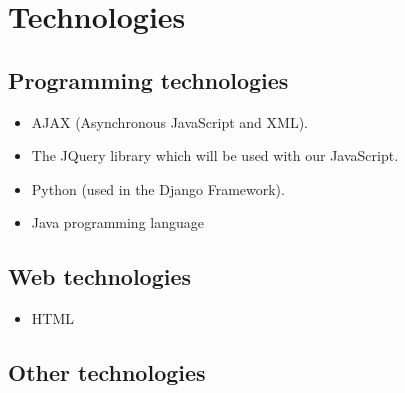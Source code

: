 \documentclass[12pt, oneside]{article}
\begin{document}
\section{Technologies}
	\subsection{Programming technologies}
		\begin{itemize}
			\item AJAX (Asynchronous JavaScript and XML).
			\item The JQuery library which will be used with our JavaScript.
			\item Python (used in the Django Framework).
			\item Java programming language 
		\end{itemize}
	\subsection{Web technologies}
		\begin{itemize}
			\item HTML
		\end{itemize}
	\subsection{Other technologies}
		\begin{itemize}
			
		\end{itemize}
\end{document}
